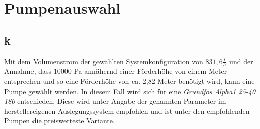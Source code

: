 \section{Pumpenauswahl}
\subsection{k}
\label{sec:Pumpe}
Mit dem Volumenstrom der gewählten Systemkonfiguration von $831,6 \frac{l}{h}$ und
der Annahme, dass 10000 Pa annähernd einer Förderhöhe von einem Meter entsprechen und so eine Förderhöhe
von ca. 2,82 Meter benötigt wird, kann eine Pumpe gewählt werden.
In diesem Fall wird sich für eine \textit{Grundfos Alpha1 25-40 180} entschieden.
Diese wird unter Angabe der genannten Parameter im herstellereigenen Auslegungssystem\cite{Grundfos} empfohlen und ist unter den
empfohlenden Pumpen die preiswerteste Variante.